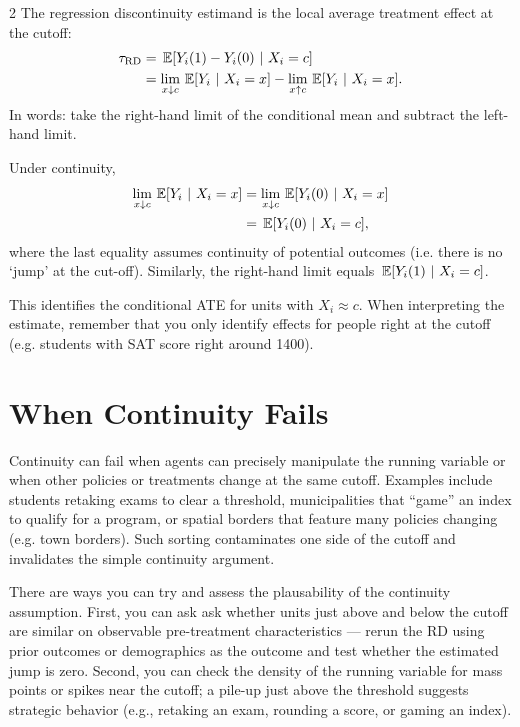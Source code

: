 \documentclass[12pt]{article}
\begin{document}
\begin{multicols}{2}
The regression discontinuity estimand is the local average treatment effect at the cutoff:
\begin{align*}
  \tau_{\text{RD}} &= 
  \expec{Y_i(1) - Y_i(0)}{X_i = c} \\ 
  &= \lim_{x \downarrow c} \expec{Y_i}{X_i = x} - 
  \lim_{x \uparrow c} \expec{Y_i}{X_i = x}.
\end{align*}
In words: take the right-hand limit of the conditional mean and subtract the left-hand limit.

Under continuity, 
\begin{align*}
  \lim_{x \downarrow c} \expec{Y_i}{X_i = x} &=
  \lim_{x \downarrow c} \expec{Y_i(0)}{X_i = x} \\
  &= \expec{Y_i(0)}{X_i = c},
\end{align*}
where the last equality assumes continuity of potential outcomes (i.e. there is no `jump' at the cut-off).
Similarly, the right-hand limit equals $\expec{Y_i(1)}{X_i = c}$.

This identifies the conditional ATE for units with $X_i \approx c$.
When interpreting the estimate, remember that you only identify effects for people right at the cutoff (e.g. students with SAT score right around 1400).

\section*{When Continuity Fails}
Continuity can fail when agents can precisely manipulate the running variable or when other policies or treatments change at the same cutoff.
Examples include students retaking exams to clear a threshold, municipalities that ``game'' an index to qualify for a program, or spatial borders that feature many policies changing (e.g. town borders).
Such sorting contaminates one side of the cutoff and invalidates the simple continuity argument.

There are ways you can try and assess the plausability of the continuity assumption. 
First, you can ask ask whether units just above and below the cutoff are similar on observable pre-treatment characteristics — rerun the RD using prior outcomes or demographics as the outcome and test whether the estimated jump is zero.
Second, you can check the density of the running variable for mass points or spikes near the cutoff; a pile-up just above the threshold suggests strategic behavior (e.g., retaking an exam, rounding a score, or gaming an index).


\end{multicols}
\end{document}
